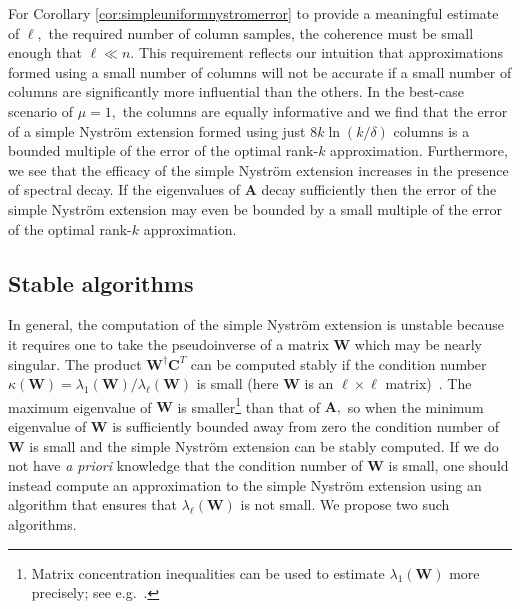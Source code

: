 \documentclass[11pt,letterpaper,twoside,reqno,nosumlimits]{amsart}
\def\pinv{\dagger}
\def\transp{T}
\newcommand{\mat}[1]{\ensuremath{\mathbf{#1}}}
\theoremstyle{remark}
\begin{document}
For Corollary \ref{cor:simpleuniformnystromerror} to provide a meaningful estimate of $\ell,$ the required number of column samples, the coherence must be small enough that $\ell \ll n.$ This requirement reflects our intuition that approximations formed using a small number of columns will not be accurate if a small number of columns are significantly more influential than the others. In the best-case scenario of $\mu=1,$ the columns are equally informative and we find that the error of a simple Nystr\"om extension formed using just $8 k \ln (k/\delta)$ columns is a bounded multiple of the error of the optimal rank-$k$ approximation. Furthermore, we see that the efficacy of the simple Nystr\"om extension increases in the presence of spectral decay. If the eigenvalues of $\mat{A}$ decay sufficiently then the error of the simple Nystr\"om extension may even be bounded by a small multiple of the error of the optimal rank-$k$ approximation.

\subsection{Stable algorithms}
\label{sec:stablealgs}
In general, the computation of the simple Nystr\"om extension is unstable because it requires one to take the pseudoinverse of a matrix $\mat{W}$ which may be nearly singular. The product $\mat{W}^\pinv \mat{C}^\transp$ can be computed stably if the condition number $\kappa(\mat{W}) = \lambda_1(\mat{W})/\lambda_\ell(\mat{W})$ is small (here $\mat{W}$ is an $\ell\times\ell$ matrix)~\cite{GL96}. The maximum eigenvalue of $\mat{W}$ is smaller\footnote{Matrix concentration inequalities can be used to estimate $\lambda_1(\mat{W})$ more precisely; see e.g.~\cite{T10,MJCFT12}.} than that of $\mat{A},$ so when the minimum eigenvalue of $\mat{W}$ is sufficiently bounded away from zero the condition number of $\mat{W}$ is small and the simple Nystr\"om extension can be stably computed. If we do not have \emph{a priori} knowledge that the condition number of $\mat{W}$ is small, one should instead compute an approximation to the simple Nystr\"om extension using an algorithm that ensures that $\lambda_\ell(\mat{W})$ is not small. We propose two such algorithms.
\end{document}
